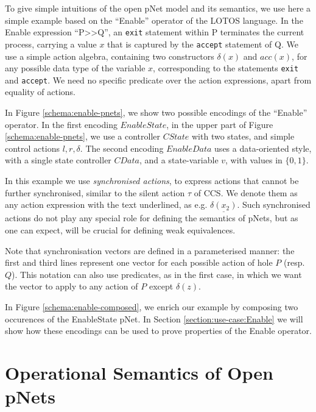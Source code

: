\documentclass[smallcondensed]{svjour3}
\begin{document}
	To give simple intuitions of the open pNet model and its semantics, we use
	here a simple example based on the ``Enable'' operator of the LOTOS language.
	In the Enable expression ``P>>Q'', an \texttt{exit} statement within P
	terminates the current process, carrying a value $x$ that
	is captured by the \texttt{accept} statement of Q. 	
	We use a simple action algebra,
	containing two constructors $\delta(x)$ and $acc(x)$, for any
	possible data type of the variable $x$, corresponding to the
	statements \texttt{exit} and \texttt{accept}. 
	We need no specific predicate over the action expressions, apart
	from equality of actions.
        
	In Figure \ref{schema:enable-pnets}, we show two possible encodings of the  
	``Enable'' operator.
        In the first encoding $EnableState$, in the upper part of
	Figure \ref{schema:enable-pnets}, we use a controller $CState$ with two
	states, and simple control actions $l, r, \delta$. The second encoding
	$EnableData$ uses a data-oriented style, with a single state controller $CData$, and a
	state-variable $v$, with values in $\{0,1\}$.

        In this example we use \emph{synchronised
          actions}, to express actions that cannot be further synchronised, similar to the
         silent action $\tau$ of CCS. We denote them as any action expression with the text
        underlined, as e.g. $\underline{\delta(x_2)}$. Such
        synchronised actions do not play any special role for defining
        the semantics of pNets, but as one can expect, will be crucial
        for defining weak equivalences.
	
	Note that synchronisation vectors are defined in a parameterised
	manner:  the first and third lines represent one vector
	for each possible action of hole $P$
	(resp. $Q$). This notation can also use predicates, as in the first
	case, in which we want the vector to apply to any action of $P$
	except $\delta(z)$.
	
	In Figure \ref{schema:enable-composed}, we enrich our example by
	composing two occurences of the EnableState pNet. In Section
        \ref{section:use-case:Enable} we will show how these encodings can
        be used to prove properties of the Enable operator.




\section{Operational Semantics of Open pNets}
\label{section:op-semantics}
\end{document}
